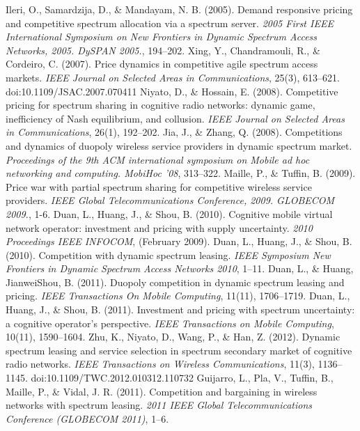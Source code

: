 \begin{thebibliography}{}
 Ileri, O., Samardzija, D., \& Mandayam, N. B. (2005). Demand responsive pricing and competitive spectrum allocation via a spectrum server. \textit{2005 First IEEE International Symposium on New Frontiers in Dynamic Spectrum Access Networks, 2005. DySPAN 2005.}, 194–202.
 Xing, Y., Chandramouli, R., \& Cordeiro, C. (2007). Price dynamics in competitive agile spectrum access markets. \textit{IEEE Journal on Selected Areas in Communications}, 25(3), 613–621. doi:10.1109/JSAC.2007.070411
 Niyato, D., \& Hossain, E. (2008). Competitive pricing for spectrum sharing in cognitive radio networks: dynamic game, inefficiency of Nash equilibrium, and collusion. \textit{IEEE Journal on Selected Areas in Communications}, 26(1), 192–202.
 Jia, J., \& Zhang, Q. (2008). Competitions and dynamics of duopoly wireless service providers in dynamic spectrum market. \textit{Proceedings of the 9th ACM international symposium on Mobile ad hoc networking and computing. MobiHoc  ’08}, 313–322.
 Maille, P., \& Tuffin, B. (2009). Price war with partial spectrum sharing for competitive wireless service providers. \textit{IEEE Global Telecommunications Conference, 2009. GLOBECOM 2009.}, 1-6.
 Duan, L., Huang, J., \& Shou, B. (2010). Cognitive mobile virtual network operator: investment and pricing with supply uncertainty. \textit{2010 Proceedings IEEE INFOCOM}, (February 2009).
 Duan, L., Huang, J., \& Shou, B. (2010). Competition with dynamic spectrum leasing. \textit{IEEE Symposium New Frontiers in Dynamic Spectrum Access Networks 2010}, 1–11.
 Duan, L., \& Huang, JianweiShou, B. (2011). Duopoly competition in dynamic spectrum leasing and pricing. \textit{IEEE Transactions On Mobile Computing}, 11(11), 1706–1719.
 Duan, L., Huang, J., \& Shou, B. (2011). Investment and pricing with spectrum uncertainty: a cognitive operator’s perspective. \textit{IEEE Transactions on Mobile Computing}, 10(11), 1590–1604.
 Zhu, K., Niyato, D., Wang, P., \& Han, Z. (2012). Dynamic spectrum leasing and service selection in spectrum secondary market of cognitive radio networks. \textit{IEEE Transactions on Wireless Communications}, 11(3), 1136–1145. doi:10.1109/TWC.2012.010312.110732
 Guijarro, L., Pla, V., Tuffin, B., Maille, P., \& Vidal, J. R. (2011). Competition and bargaining in wireless networks with spectrum leasing. \textit{2011 IEEE Global Telecommunications Conference (GLOBECOM 2011)}, 1–6.

\end{thebibliography}

